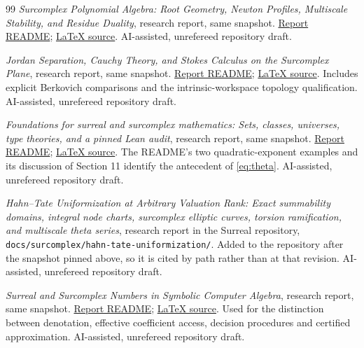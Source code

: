 \documentclass[11pt,a4paper]{article}
\numberwithin{equation}{section}
\theoremstyle{definition}
\theoremstyle{remark}
\newcommand{\repobase}{https://github.com/VladimirReshetnikov/Surreal/blob/e260237db9b71da8b74a0c13c8e6355119091100/}
\begin{document}
\begin{thebibliography}{99}
\emph{Surcomplex Polynomial Algebra: Root Geometry, Newton Profiles,
Multiscale Stability, and Residue Duality}, research report, same snapshot.
\href{\repobase docs/surcomplex/polynomial-algebra/README.md}{Report README};
\href{\repobase docs/surcomplex/polynomial-algebra/article.tex}{LaTeX source}.
AI-assisted, unrefereed repository draft.

\emph{Jordan Separation, Cauchy Theory, and Stokes Calculus on the Surcomplex
Plane}, research report, same snapshot.
\href{\repobase docs/surcomplex/contours-and-stokes/README.md}{Report README};
\href{\repobase docs/surcomplex/contours-and-stokes/article.tex}{LaTeX source}.
Includes explicit Berkovich comparisons and the intrinsic-workspace topology
qualification. AI-assisted, unrefereed repository draft.

\emph{Foundations for surreal and surcomplex mathematics: Sets, classes,
universes, type theories, and a pinned Lean audit}, research report,
same snapshot.
\href{\repobase docs/foundations-and-computation/foundations/README.md}{Report README};
\href{\repobase docs/foundations-and-computation/foundations/article.tex}{LaTeX source}.
The README's two quadratic-exponent examples and its discussion of
Section 11 identify the antecedent of \eqref{eq:theta}.
AI-assisted, unrefereed repository draft.

\emph{Hahn--Tate Uniformization at Arbitrary Valuation Rank: Exact
summability domains, integral node charts, surcomplex elliptic curves,
torsion ramification, and multiscale theta series},
research report in the Surreal repository,
\texttt{docs/surcomplex/hahn-tate-uniformization/}.
Added to the repository after the snapshot pinned above, so it is cited by
path rather than at that revision.
AI-assisted, unrefereed repository draft.

\emph{Surreal and Surcomplex Numbers in Symbolic Computer Algebra}, research
report, same snapshot.
\href{\repobase docs/foundations-and-computation/computer-algebra/README.md}{Report README};
\href{\repobase docs/foundations-and-computation/computer-algebra/article.tex}{LaTeX source}.
Used for the distinction between denotation, effective coefficient access,
decision procedures and certified approximation.
AI-assisted, unrefereed repository draft.

\end{thebibliography}
\end{document}
